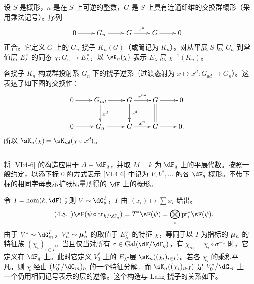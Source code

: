 设 $S$ 是概形，$n$ 是在 $S$ 上可逆的整数，$G$ 是 $S$ 上具有连通纤维的交换群概形（采用乘法记号）。序列
\[\xymatrix{
  0 \ar[r]
    & G_n \ar[r]
    & G \ar[r]^-{x^n}
    & G \ar[r]
    & 0
}\]
正合。它定义 $G$ 上的 $G_n$-挠子 $K_n(G)$（或简记为 $K_n$）。对从平展 $S$-层 $G_n$ 到常值层 $E_\lambda^\times$ 的同态 $\chi:G_n \to E_\lambda^\times$，以 $\sK_n(\chi)$ 表示 $E_\lambda$-层 $\chi^{-1}(K_n)$。

各挠子 $K_n$ 构成群投射系 $G_n$ 下的挠子逆系（过渡态射为 $x\mapsto x^d:G_{n d}\to G_n$）。这表达了如下图的交换性：
\[\xymatrix{
  0 \ar[r]
    & G_{n d} \ar[r] \ar[d]^-{x^d}
    & G \ar[r]^-{x^{n d}} \ar[d]^-{x^d}
    & G \ar[r] \ar@{=}[d]
    & 0 \\
  0 \ar[r]
    & G_n \ar[r]
    & G \ar[r]^-{x^n}
    & G \ar[r]
    & 0 \text{.}
}\]
所以 $\sK_n(\chi) = \sK_{n d}(\chi\circ x^d)$。

\subsection{}\label{VI:4-8}

将 \ref{VI:4-6} 的构造应用于 $A=\dF_q$，并取 $M=k$ 为 $\dF_q$ 上的平展代数。按照一般约定，以添下标 $0$ 的方式表示 \ref{VI:4-6} 中记为 $V,V^\ast,\ldots$ 的各 $\dF_q$-概形。不带下标的相同字母表示扩张标量所得的 $\dF$ 上的概形。

令 $I=\hom(k,\dF)$；则 $V\sim \dG_a^I$，$T$ 由 $(x_i)\mapsto \sum x_i$ 给出。
\begin{equation*}\tag{4.8.1}\label{VI:eq:4-8-1}
  \sF(\psi\circ \tr_{k/\dF_q}) = T^\ast \sF(\psi) = \bigotimes_i \pr_i^\ast \sF(\psi) \text{.}
\end{equation*}
由于 $V^\ast\sim \dG_m^I$，$V_n^\ast\sim {\bm\mu}_n^I$ 的取值于 $E_\lambda^\times$ 的特征 $\chi$，等同于以 $I$ 为指标的 ${\bm\mu}_n$ 的特征族 $(\chi_i)_{i\in I}$。当且仅当对所有 $\sigma\in \gal(\dF/\dF_q)$，有 $\chi_{\sigma_i} = \chi_i\circ \sigma^{-1}$ 时，它定义在 $\dF_q$ 上。此时它定义 $V_0^\ast$ 上的 $E_\lambda$-层 $\sK_n((\chi_i)_{i\in I})$。若各 $\chi_i$ 的乘积平凡，则 $\chi$ 经由 $(V_0^\ast/\dG_m)_n$ 的一个特征分解，而 $\sK_n((\chi_i)_{i\in I})$ 是 $V_0^\ast/\dG_m$ 上一个仍用相同记号表示的层的逆像。这个构造与 Lang 挠子的关系如下。

